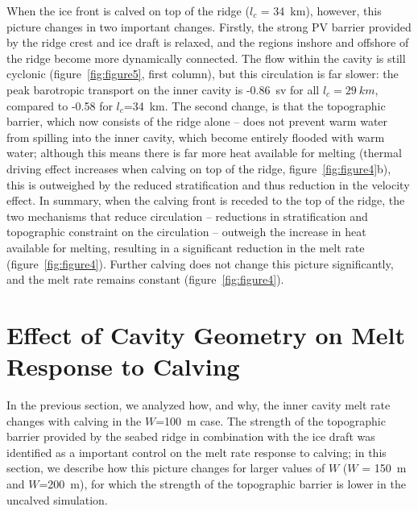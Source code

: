 \documentclass[draft]{agujournal2019}
\begin{document}
When the ice front is calved on top of the ridge ($l_c$ = 34~km), however, this picture changes in two important changes. Firstly, the strong PV barrier provided by the ridge crest and ice draft is relaxed, and the regions inshore and offshore of the ridge become more dynamically connected. The flow within the cavity is still cyclonic (figure~\ref{fig:figure5}, first column), but this circulation is far slower: the peak barotropic transport on the inner cavity is -0.86~sv for all $l_c = 29~km$, compared to -0.58 for $l_c$=34~km. The second change, is that the topographic barrier, which now consists of the ridge alone -- does not prevent warm water from spilling into the inner cavity, which become entirely flooded with warm water; although this means there is far more heat available for melting (thermal driving effect increases when calving on top of the ridge, figure~\ref{fig:figure4}b), this is outweighed by the reduced stratification and thus reduction in the velocity effect. In summary, when the calving front is receded to the top of the ridge, the two mechanisms that reduce circulation -- reductions in stratification and topographic constraint on the circulation -- outweigh the increase in heat available for melting, resulting in a significant reduction in the melt rate (figure~\ref{fig:figure4}). Further calving does not change this picture significantly, and the melt rate remains constant (figure~\ref{fig:figure4}).


\section{Effect of Cavity Geometry on Melt Response to Calving}\label{S:Results:H}
In the previous section, we analyzed how, and why, the inner cavity melt rate changes with calving in the $W$=100~m case. The strength of the topographic barrier provided by the seabed ridge in combination with the ice draft was identified as a important control on the melt rate response to calving; in this section, we describe how this picture changes for larger values of $W$ ($W$ = 150~m and $W$=200~m), for which the strength of the topographic barrier is lower in the uncalved simulation.

\end{document}
